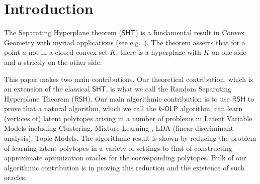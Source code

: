 \documentclass[11pt,letterpaper]{article}
\newcommand{\rsh}{{\mathsf {RSH}}\xspace}
\newcommand{\sht}{{\mathsf {SHT}}\xspace}
\newcommand{\olp}{{\mathsf {OLP}}\xspace}
\newcommand{\kolp}{k\mbox{-}\olp}
\begin{document}
\section{Introduction}
The Separating Hyperplane theorem ($\sht$) is a fundamental result in Convex Geometry with myriad applications (see e.g.~\cite{bertsekas2009convex}). The theorem asserts that for a point $a$ not in a closed convex set $K$, there is a hyperplane with $K$ on one side and $a$ strictly on the other side. 


This paper makes two main contributions.
Our theoretical contribution, which is an extension of the classical $\sht$,  is what we call the Random Separating Hyperplane Theorem ($\rsh$). Our main algorithmic contribution is to use $\rsh$ to prove that a natural algorithm, which we call the $\kolp$ algorithm, can learn (vertices of) latent polytopes arising in a number of problems in Latent Variable Models including Clustering, Mixture Learning , LDA (linear discriminant analysis), Topic Models.  The algorithmic result is shown by reducing the problem of learning latent polytopes in a variety of settings to that of constructing approximate optimization oracles for the corresponding polytopes. Bulk of our algorithmic contribution is in proving this reduction and the existence of such oracles. 





\vspace*{-0.1in}
\end{document}
